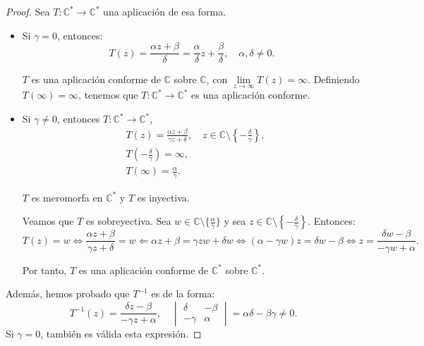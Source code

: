 \begin{proof}
    Sea $T: \mathbb{C}^\ast \to \mathbb{C}^\ast$ una aplicación de esa forma.
    \begin{itemize}
        \item Si $\gamma = 0$, entonces:
              $$T(z) = \frac{\alpha z + \beta}{\delta} = \frac{\alpha}{\delta}z + \frac{\beta}{\delta}, \quad \alpha, \delta \neq 0.$$

              $T$ es una aplicación conforme de $\mathbb{C}$ sobre $\mathbb{C}$, con $\lim\limits_{z \to \infty} T(z) = \infty$.
              Definiendo $T(\infty) = \infty$, tenemos que $T: \mathbb{C}^\ast \to \mathbb{C}^\ast$ es una aplicación conforme.

        \item Si $\gamma \neq 0$, entonces $T: \mathbb{C}^\ast \to \mathbb{C}^\ast$,
              \begin{align*}
                   & T(z) = \frac{\alpha z + \beta}{\gamma z + \delta}, \quad z \in \mathbb{C} \setminus \left\{-\frac{\delta}{\gamma}\right\}, \\
                   & T\left(-\frac{\delta}{\gamma}\right) = \infty,                                                                             \\
                   & T(\infty) = \frac{\alpha}{\gamma}.
              \end{align*}

              $T$ es meromorfa en $\mathbb{C}^\ast$ y $T$ es inyectiva.

              Veamos que $T$ es sobreyectiva.
              Sea $w \in \mathbb{C} \setminus \{\frac{\alpha}{\gamma}\}$ y sea $z \in \mathbb{C} \setminus \left\{-\frac{\delta}{\gamma}\right\}$.
              Entonces:
              $$T(z) = w \Leftrightarrow \frac{\alpha z + \beta}{\gamma z + \delta} = w \Leftarrow \alpha z + \beta = \gamma zw + \delta w \Leftrightarrow (\alpha - \gamma w)z = \delta w - \beta \Leftrightarrow z = \frac{\delta w - \beta}{-\gamma w + \alpha}.$$

              Por tanto, $T$ es una aplicación conforme de $\mathbb{C}^\ast$ sobre $\mathbb{C}^\ast$.
    \end{itemize}

    Además, hemos probado que $T^{-1}$ es de la forma:
    $$T^{-1}(z) = \frac{\delta z - \beta}{-\gamma z + \alpha}, \quad \begin{vmatrix}
            \delta  & -\beta \\
            -\gamma & \alpha
        \end{vmatrix} = \alpha\delta - \beta\gamma \neq 0.$$
    Si $\gamma = 0$, también es válida esta expresión.
\end{proof}

